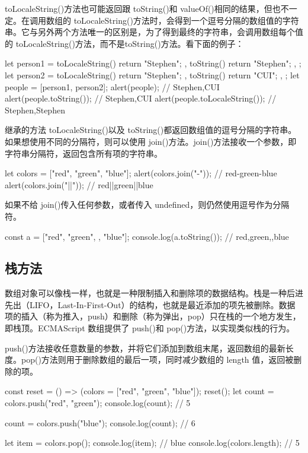 toLocaleString()方法也可能返回跟 toString()和 valueOf()相同的结果，但也不一定。在调用数组的 toLocaleString()方法时，会得到一个逗号分隔的数组值的字符串。它与另外两个方法唯一的区别是，为了得到最终的字符串，会调用数组每个值的 toLocaleString()方法，而不是toString()方法。看下面的例子：
\begin{js}
let person1 = {
toLocaleString() {
    return "Stephen";
},
toString() {
    return "Stephen";
},
};
let person2 = {
toLocaleString() {
    return "Stephen";
},
toString() {
    return "CUI";
},
};
let people = [person1, person2];
alert(people); // Stephen,CUI
alert(people.toString()); // Stephen,CUI
alert(people.toLocaleString()); // Stephen,Stephen
\end{js}

继承的方法 toLocaleString()以及 toString()都返回数组值的逗号分隔的字符串。如果想使用不同的分隔符，则可以使用 join()方法。join()方法接收一个参数，即字符串分隔符，返回包含所有项的字符串。

\begin{js}
let colors = ["red", "green", "blue"];
alert(colors.join("-")); // red-green-blue
alert(colors.join("||")); // red||green||blue
\end{js}

如果不给 join()传入任何参数，或者传入 undefined，则仍然使用逗号作为分隔符。


\begin{js}
const a = ["red", "green", , "blue"];
console.log(a.toString()); // red,green,,blue
\end{js}
\subsection{栈方法}
数组对象可以像栈一样，也就是一种限制插入和删除项的数据结构。栈是一种后进先出（LIFO，Last-In-First-Out）的结构，也就是最近添加的项先被删除。数据项的插入（称为推入，push）和删除（称为弹出，pop）只在栈的一个地方发生，即栈顶。ECMAScript 数组提供了 push()和 pop()方法，以实现类似栈的行为。

push()方法接收任意数量的参数，并将它们添加到数组末尾，返回数组的最新长度。pop()方法则用于删除数组的最后一项，同时减少数组的 length 值，返回被删除的项。

\begin{js}
const reset = () => (colors = ["red", "green", "blue"]);
reset();
let count = colors.push("red", "green");
console.log(count); // 5

count = colors.push("blue");
console.log(count); // 6

let item = colors.pop();
console.log(item); // blue
console.log(colors.length); // 5
\end{js}
